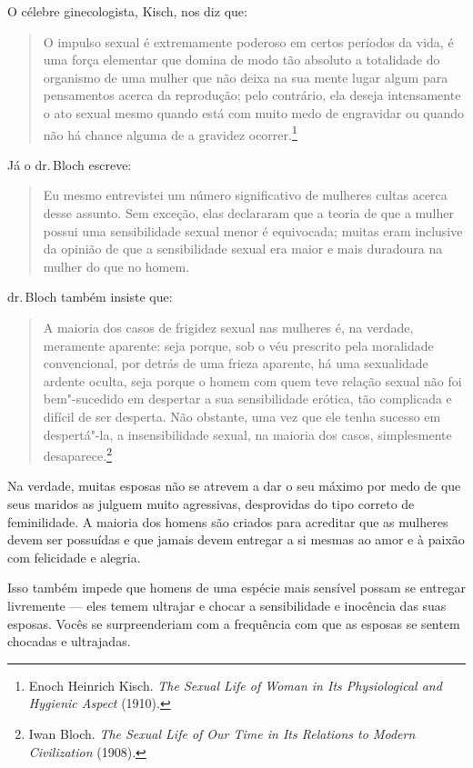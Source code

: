 O célebre ginecologista, Kisch, nos diz que:

\begin{quote}
O impulso sexual é extremamente poderoso em certos períodos da vida, é
uma força elementar que domina de modo tão absoluto a totalidade do
organismo de uma mulher que não deixa na sua mente lugar algum para
pensamentos acerca da reprodução; pelo contrário, ela deseja
intensamente o ato sexual mesmo quando está com muito medo de engravidar
ou quando não há chance alguma de a gravidez ocorrer.\footnote{Enoch
  Heinrich Kisch. \textit{The Sexual Life of Woman in Its Physiological
  and Hygienic Aspect} (1910).}
\end{quote}  

Já o dr.\,Bloch escreve:

\begin{quote}
Eu mesmo entrevistei um número significativo de mulheres cultas acerca
desse assunto. Sem exceção, elas declararam que a teoria de que a mulher
possui uma sensibilidade sexual menor é equivocada; muitas eram
inclusive da opinião de que a sensibilidade sexual era maior e mais
duradoura na mulher do que no homem.
\end{quote}

dr.\,Bloch também insiste que: 

\begin{quote}
A maioria dos casos de frigidez sexual
nas mulheres é, na verdade, meramente aparente: seja porque, sob o véu
prescrito pela moralidade convencional, por detrás de uma frieza
aparente, há uma sexualidade ardente oculta, seja porque o homem com
quem teve relação sexual não foi bem"-sucedido em despertar a sua
sensibilidade erótica, tão complicada e difícil de ser desperta. Não
obstante, uma vez que ele tenha sucesso em despertá"-la, a
insensibilidade sexual, na maioria dos casos, simplesmente
desaparece.\footnote{Iwan Bloch. \textit{The Sexual Life of Our Time
  in Its Relations to Modern Civilization} (1908).}
\end{quote}

Na verdade, muitas esposas não se atrevem a dar o seu máximo por medo de
que seus maridos as julguem muito agressivas, desprovidas do tipo
correto de feminilidade. A maioria dos homens são criados para acreditar
que as mulheres devem ser possuídas e que jamais devem entregar a si
mesmas ao amor e à paixão com felicidade e alegria.

Isso também impede que homens de uma espécie mais sensível possam se
entregar livremente --- eles temem ultrajar e chocar a sensibilidade e
inocência das suas esposas. Vocês se surpreenderiam com a frequência com que
as esposas se sentem chocadas e ultrajadas.

